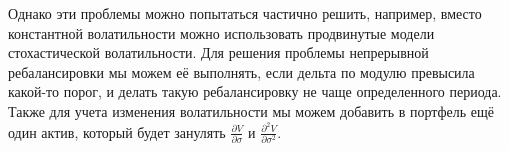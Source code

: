 \documentclass[a4paper]{article}
\theoremstyle{definition}
\begin{document}
    Однако эти проблемы можно попытаться частично решить, например, вместо константной волатильности можно использовать продвинутые модели стохастической волатильности. 
    Для решения проблемы непрерывной ребалансировки мы можем её выполнять, если дельта по модулю превысила какой-то порог, и делать такую ребалансировку не чаще определенного периода. 
    Также для учета изменения волатильности мы можем добавить в портфель ещё один актив, который будет занулять $\frac{\partial V}{\partial \sigma}$ и $\frac{\partial^2 V}{\partial \sigma^2}$.
\end{document}
